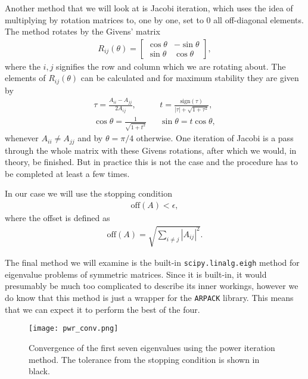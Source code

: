 \documentclass[10pt,a4paper,twocolumn]{article}
\begin{document}
Another method that we will look at is Jacobi iteration, which uses the idea of multiplying by rotation matrices to, one by one, set to $0$ all off-diagonal elements. The method rotates by the Givens' matrix
%
\begin{align}
    R_{ij}(\theta) = \begin{bmatrix}
        \cos\theta & -\sin \theta\\
        \sin \theta & \cos \theta
    \end{bmatrix},
\end{align}
%
where the $i,j$ signifies the row and column which we are rotating about. The elements of $R_{ij}(\theta)$ can be calculated and for maximum stability they are given by
%
\begin{align}
    &\tau = \frac{A_{ii} - A_{jj}}{2 A_{ij}},& &t = \frac{\mathrm{sign}(\tau)}{|\tau| + \sqrt{1+\tau^2}},&\\
    &\cos \theta = \frac{1}{\sqrt{1+t^2}}&  &\sin \theta = t \cos \theta,&
\end{align}
%
whenever $A_{ii} \neq A_{jj}$ and by $\theta = \pi /4$ otherwise. One iteration of Jacobi is a pass through the whole matrix with these Givens rotations, after which we would, in theory, be finished. But in practice this is not the case and the procedure has to be completed at least a few times.

In our case we will use the stopping condition
%
\begin{align}
    \mathrm{off}(A) < \epsilon,
\end{align}
%
where the offset is defined as
%
\begin{align}
    \mathrm{off}(A) = \sqrt{\sum_{i \neq j} |A_{ij}|^2}.
\end{align}

The final method we will examine is the built-in \texttt{scipy.linalg.eigh} method for eigenvalue problems of symmetric matrices. Since it is built-in, it would presumably be much too complicated to describe its inner workings, however we do know that this method is just a wrapper for the \texttt{ARPACK} library. This means that we can expect it to perform the best of the four.

\begin{figure}[!t]
    \centering
    \texttt{[image: pwr\_conv.png]}
    \caption{Convergence of the first seven eigenvalues using the power iteration method. The tolerance from the stopping condition is shown in black.}
    \label{fig:pwr_conv}
\end{figure}
\end{document}
